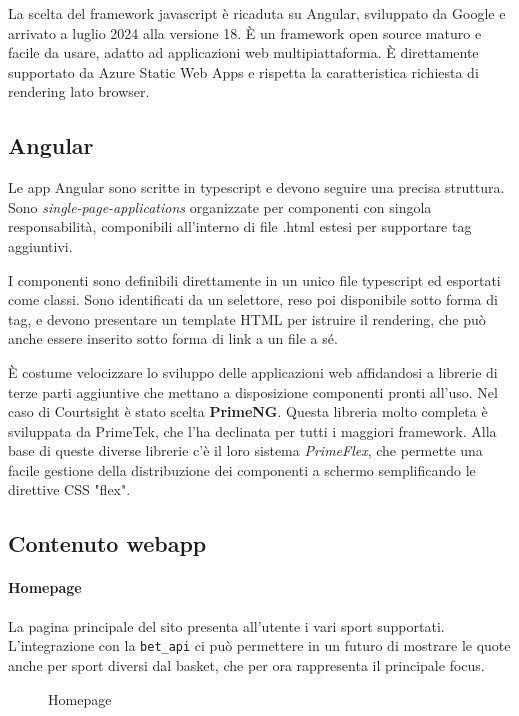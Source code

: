 La scelta del framework javascript è ricaduta su Angular, sviluppato da Google e arrivato a luglio 2024 alla versione 18. È un framework open source maturo e facile da usare, adatto ad applicazioni web multipiattaforma.
È direttamente supportato da Azure Static Web Apps e rispetta la caratteristica richiesta di rendering lato browser.


\subsection{Angular}
Le app Angular sono scritte in typescript e devono seguire una precisa struttura. Sono \textit{single-page-applications} organizzate per componenti con singola responsabilità, componibili all'interno di file .html estesi per supportare tag aggiuntivi.

I componenti sono definibili direttamente in un unico file typescript ed esportati come classi. Sono identificati da un selettore, reso poi disponibile sotto forma di tag, e devono presentare un template HTML per istruire il rendering, che può anche essere inserito sotto forma di link a un file a sé.

È costume velocizzare lo sviluppo delle applicazioni web affidandosi a librerie di terze parti aggiuntive che mettano a disposizione componenti pronti all'uso. Nel caso di Courtsight è stato scelta \textbf{PrimeNG}.
Questa libreria molto completa è sviluppata da PrimeTek, che l'ha declinata per tutti i maggiori framework. Alla base di queste diverse librerie c'è il loro sistema \textit{PrimeFlex}, che permette una facile gestione della distribuzione dei componenti a schermo semplificando le direttive CSS "flex".

\subsection{Contenuto webapp}
    \paragraph{Homepage} La pagina principale del sito presenta all'utente i vari sport supportati. L'integrazione con la \texttt{bet\_api} ci può permettere in un futuro di mostrare le quote anche per sport diversi dal basket, che per ora rappresenta il principale focus.
    
    \begin{figure}[H]
        \centering
        \caption{Homepage}
        \label{fig:enter-label}
    \end{figure}
    
